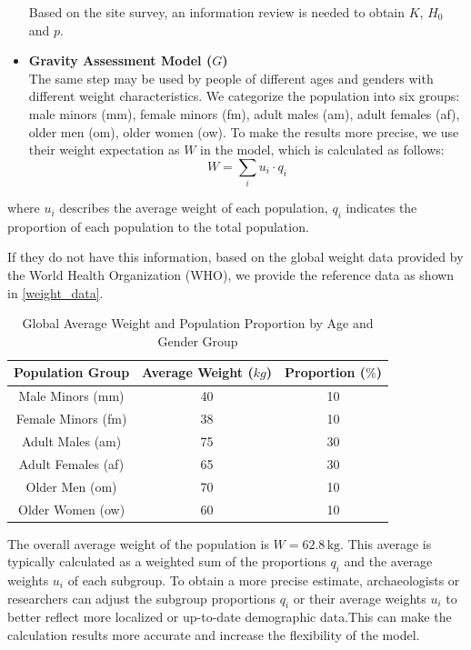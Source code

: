 \documentclass[12pt]{article}  %
\numberwithin{equation}{section} %
\begin{document}
\begin{itemize}
Based on the site survey, an information review is needed to obtain $K$, $H_0$ and $p$.

   \item \textbf{Gravity Assessment Model ($G$)}\\
   \quad The same step may be used by people of different ages and genders with different weight characteristics. We categorize the population into six groups: male minors (mm), female minors (fm), adult males (am), adult females (af), older men (om), older women (ow). To make the results more precise, we use their weight expectation as $W$ in the model, which is calculated as follows:
    \begin{equation}
        W=\sum_{i}u_i\cdot{q_i}
    \end{equation}
    \end{itemize}
    \quad where $u_i$ describes the average weight of each population, $q_i$ indicates the proportion of each population to the total population. 
    
    \quad If they do not have this information, based on the global weight data provided by the World Health Organization (WHO)\cite{6}\cite{7}, we provide the reference data as shown in \autoref{weight_data}.

    \begin{table}[H]
    \centering
    \caption{Global Average Weight and Population Proportion by Age and Gender Group}
    \renewcommand{\arraystretch}{1.5}
    \setlength{\tabcolsep}{12pt}
    \begin{tabular}{ccc}
        \hline
        \hline
        \textbf{Population Group} & \textbf{Average Weight ($kg$)} & \textbf{Proportion ($\%$)} \\
        \hline
        Male Minors (mm) & 40 & 10 \\
        Female Minors (fm) & 38 & 10 \\
        Adult Males (am) & 75 & 30 \\
        Adult Females (af) & 65 & 30 \\
        Older Men (om) & 70 & 10 \\
        Older Women (ow) & 60 & 10 \\
        \hline
        \hline
    \end{tabular}
    \label{weight_data}
\end{table}


\quad The overall average weight of the population is $W = 62.8\,\mathrm{kg}$. This average is typically calculated as a weighted sum of the proportions $q_i$ and the average weights $u_i$ of each subgroup. To obtain a more precise estimate, archaeologists or researchers can adjust the subgroup proportions $q_i$ or their average weights $u_i$ to better reflect more localized or up-to-date demographic data.This can make the calculation results more accurate and increase the flexibility of the model.
\end{document}
